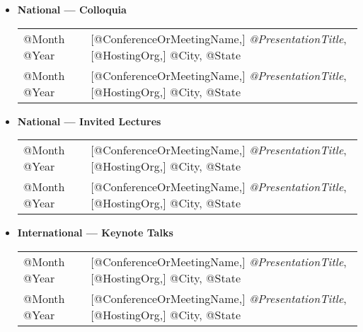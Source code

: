 \documentclass[10pt]{article}
\begin{document}
\begin{itemize}
\item[] \textbf{National --- Colloquia}
\\[1.3ex]
\begin{tabular}{l@{\quad\ }p{34em}} 
 @Month @Year 
 & [@ConferenceOrMeetingName,] \emph{@PresentationTitle},
   [@HostingOrg,]
   @City, @State
   \smallskip \\
 @Month @Year 
 & [@ConferenceOrMeetingName,] \emph{@PresentationTitle},
   [@HostingOrg,]
   @City, @State
\end{tabular}

\item[] \textbf{National --- Invited Lectures}
\\[1.3ex]
\begin{tabular}{l@{\quad\ }p{34em}} 
 @Month @Year 
 & [@ConferenceOrMeetingName,] \emph{@PresentationTitle},
   [@HostingOrg,]
   @City, @State
   \smallskip \\
 @Month @Year 
 & [@ConferenceOrMeetingName,] \emph{@PresentationTitle},
   [@HostingOrg,]
   @City, @State
\end{tabular}


\item[] \textbf{International --- Keynote Talks}
\\[1.3ex]
\begin{tabular}{l@{\quad\ }p{34em}} 
 @Month @Year 
 & [@ConferenceOrMeetingName,] \emph{@PresentationTitle},
   [@HostingOrg,]
   @City, @State
   \smallskip \\
 @Month @Year 
 & [@ConferenceOrMeetingName,] \emph{@PresentationTitle},
   [@HostingOrg,]
   @City, @State
\end{tabular}


\end{itemize}
\end{document}
